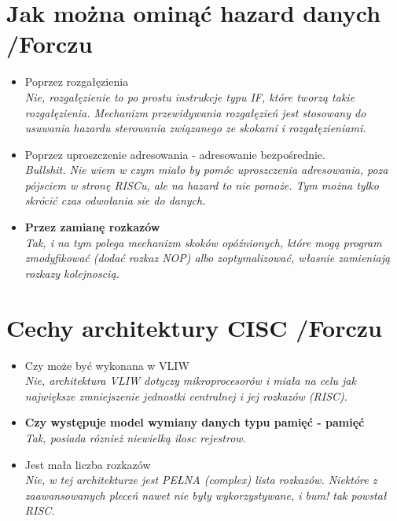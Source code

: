 \documentclass[a4paper,twoside]{article}
\begin{document}
\section{Jak można ominąć hazard danych {\small /Forczu}}
	\begin{itemize}
    \item Poprzez rozgałęzienia\\
    {\small \emph{Nie, rozgałęzienie to po prostu instrukcje typu IF, które tworzą takie rozgałęzienia. Mechanizm przewidywania rozgałęzień jest stosowany do usuwania hazardu sterowania związanego ze skokami i rozgałęzieniami.}}
    \item Poprzez uproszczenie adresowania - adresowanie bezpośrednie.\\
    {\small \emph{Bullshit. Nie wiem w czym miało by pomóc uproszczenia adresowania, poza pójsciem w stronę RISCu, ale na hazard to nie pomoże. Tym można tylko skrócić czas odwołania sie do danych.}}
    \item \textbf{Przez zamianę rozkazów}\\
    {\small \emph{Tak, i na tym polega mechanizm skoków opóźnionych, które mogą program zmodyfikować (dodać rozkaz NOP) albo zoptymalizować, własnie zamieniają rozkazy kolejnoscią.}}
    \end{itemize}

\section{Cechy architektury CISC {\small /Forczu}}
	\begin{itemize}
    \item Czy może być wykonana w VLIW\\
    {\small \emph{Nie, architektura VLIW dotyczy mikroprocesorów i miała na celu jak największe zmniejszenie jednostki centralnej i jej rozkazów (RISC)}. }
    \item \textbf{Czy występuje model wymiany danych typu pamięć - pamięć}\\
    {\small \emph{Tak, posiada róznież niewielką ilosc rejestrow.}}
    \item Jest mała liczba rozkazów\\
    {\small \emph{Nie, w tej architekturze jest PEŁNA (complex) lista rozkazów. Niektóre z zaawansowanych pleceń nawet nie były wykorzystywane, i bum! tak powstał RISC.}}
    \end{itemize}
\end{document}
